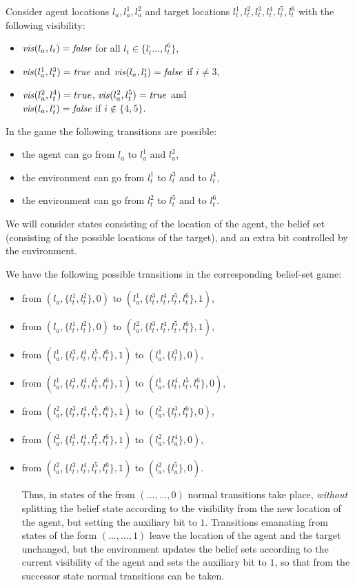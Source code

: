 \begin{example}
Consider agent locations $l_a,l_a^1,l_a^2$ and target locations 
$l_t^1,l_t^2,l_t^3,l_t^4,l_t^5,l_t^6$ with the following visibility:
\begin{itemize}
\item $\mathit{vis}(l_a,l_t) =\mathit{false}$ for all $l_t \in \{l_t^,\ldots,l_t^6\}$,
\item $\mathit{vis}(l_a^1,l_t^3) =\mathit{true}$ and $\mathit{vis}(l_a,l_t^i) =\mathit{false}$ if $i \neq 3$,
\item $\mathit{vis}(l_a^2,l_t^4) =true$, $\mathit{vis}(l_a^2,l_t^5) =\mathit{true}$ and\\ $\mathit{vis}(l_a,l_t^i) =\mathit{false}$ if $i \not \in \{4,5\}$.
\end{itemize}
In the game the following transitions are possible:
\begin{itemize}
\item the agent can go from $l_a$ to $l_a^1$ and $l_a^2$,
\item the environment can go from $l_t^1$ to $l_t^3$ and to $l_t^4$,
\item the environment can go from $l_t^2$ to $l_t^5$ and to $l_t^6$.
\end{itemize}


We will consider states consisting of the location of the agent, the belief set (consisting of the possible locations of the target), and an extra bit controlled by the environment.

We have the following  possible transitions in the corresponding belief-set game:
\begin{itemize}
\item from $(l_a,\{l_t^1,l_t^2\},0)$ to $(l_a^1,\{l_t^3,l_t^4,l_t^5,l_t^6\},1)$,
\item from $(l_a,\{l_t^1,l_t^2\},0)$ to $(l_a^2,\{l_t^3,l_t^4,l_t^5,l_t^6\},1)$,
\item from $(l_a^1,\{l_t^3,l_t^4,l_t^5,l_t^6\},1)$ to $(l_a^1,\{l_t^3\},0)$,
\item from $(l_a^1,\{l_t^3,l_t^4,l_t^5,l_t^6\},1)$ to $(l_a^1,\{l_t^4,l_t^5,l_t^6\},0)$,
\item from $(l_a^2,\{l_t^3,l_t^4,l_t^5,l_t^6\},1)$ to $(l_a^2,\{l_t^3,l_t^6\},0)$,
\item from $(l_a^2,\{l_t^3,l_t^4,l_t^5,l_t^6\},1)$ to $(l_a^2,\{l_a^4\},0)$,
\item from $(l_a^2,\{l_t^3,l_t^4,l_t^5,l_t^6\},1)$ to $(l_a^2,\{l_a^5\},0)$.

Thus, in states of the from $(...,...,0)$ normal transitions take place, \emph{without} splitting the belief state according to the visibility from the new location of the agent, but setting the auxiliary bit to $1$. Transitions emanating from states of the form $(...,...,1)$ leave the location of the agent and the target unchanged, but the environment updates the belief sets according to the current visibility of the agent and sets the auxiliary bit to $1$, so that from the successor state normal transitions can be taken.




\end{itemize}

\end{example}